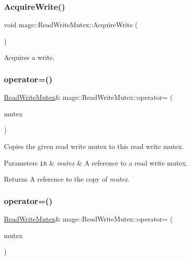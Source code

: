 \subsubsection{\texorpdfstring{Acquire\+Write()}{AcquireWrite()}}
{\footnotesize\ttfamily void mage\+::\+Read\+Write\+Mutex\+::\+Acquire\+Write (\begin{DoxyParamCaption}{ }\end{DoxyParamCaption})\hspace{0.3cm}{\ttfamily [private]}}

Acquires a write. \hypertarget{classmage_1_1_read_write_mutex_a408e06f3c8bcc644e43afbf7e9ac772f}{}\label{classmage_1_1_read_write_mutex_a408e06f3c8bcc644e43afbf7e9ac772f} 
\subsubsection{\texorpdfstring{operator=()}{operator=()}\hspace{0.1cm}{\footnotesize\ttfamily [1/2]}}
{\footnotesize\ttfamily \hyperlink{classmage_1_1_read_write_mutex}{Read\+Write\+Mutex}\& mage\+::\+Read\+Write\+Mutex\+::operator= (\begin{DoxyParamCaption}\item[{const \hyperlink{classmage_1_1_read_write_mutex}{Read\+Write\+Mutex} \&}]{mutex }\end{DoxyParamCaption})\hspace{0.3cm}{\ttfamily [delete]}}

Copies the given read write mutex to this read write mutex.


\begin{DoxyParams}[1]{Parameters}
\mbox{\tt in}  & {\em mutex} & A reference to a read write mutex. \\
\hline
\end{DoxyParams}
\begin{DoxyReturn}{Returns}
A reference to the copy of {\itshape mutex}. 
\end{DoxyReturn}
\hypertarget{classmage_1_1_read_write_mutex_a14ea4d1be75046741a7663e0d86a017a}{}\label{classmage_1_1_read_write_mutex_a14ea4d1be75046741a7663e0d86a017a} 
\subsubsection{\texorpdfstring{operator=()}{operator=()}\hspace{0.1cm}{\footnotesize\ttfamily [2/2]}}
{\footnotesize\ttfamily \hyperlink{classmage_1_1_read_write_mutex}{Read\+Write\+Mutex}\& mage\+::\+Read\+Write\+Mutex\+::operator= (\begin{DoxyParamCaption}\item[{\hyperlink{classmage_1_1_read_write_mutex}{Read\+Write\+Mutex} \&\&}]{mutex }\end{DoxyParamCaption})\hspace{0.3cm}{\ttfamily [delete]}}

